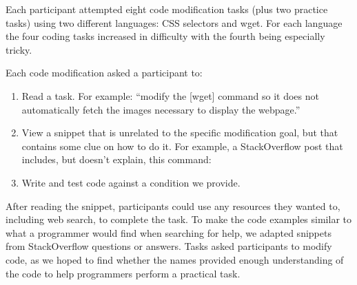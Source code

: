 Each participant attempted eight code modification tasks (plus two practice tasks) using two different languages: CSS selectors and wget.
For each language the four coding tasks increased in difficulty with the fourth being especially tricky.

\begin{changes}
Each code modification asked a participant to:
\begin{enumerate}
    \item Read a task.  For example: ``modify the [wget] command so it does not automatically fetch the images necessary to display the webpage.''
\item View a snippet that is unrelated to the specific modification goal, but that contains some clue on how to do it.  For example, a StackOverflow post that includes, but doesn't explain, this command:
\vspace{.2em}
\vspace{.6em}
\item Write and test code against a condition we provide.
\end{enumerate}

After reading the snippet, participants could use any resources they wanted to, including web search, to complete the task.
To make the code examples similar to what a programmer would find when searching for help, we adapted snippets from StackOverflow questions or answers.
Tasks asked participants to modify code, as we hoped to find whether the \Glspl{name} provided enough understanding of the code to help programmers perform a practical task.
\end{changes}

